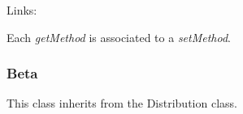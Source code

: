\begin{description}
\begin{description}
\end{description}
\bigskip

\item[Links:]  \rule{0pt}{1em}
\end{description}


Each  \textit{getMethod}  is associated to a \textit{setMethod}.


\newpage
\subsubsection{Beta}

This class inherits from the Distribution class.

